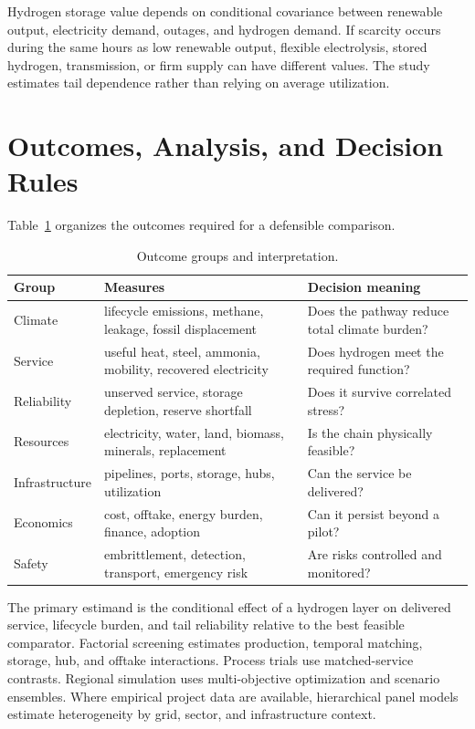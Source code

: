 \documentclass[conference]{IEEEtran}
\begin{document}
Hydrogen storage value depends on conditional covariance between renewable output, electricity demand, outages, and hydrogen demand. If scarcity occurs during the same hours as low renewable output, flexible electrolysis, stored hydrogen, transmission, or firm supply can have different values. The study estimates tail dependence rather than relying on average utilization.

\section{Outcomes, Analysis, and Decision Rules}
\label{sec:analysis}
Table~\ref{tab:outcomes} organizes the outcomes required for a defensible comparison.

\begin{table}[t]
\centering
\caption{Outcome groups and interpretation.}
\label{tab:outcomes}
\scriptsize
\setlength{\tabcolsep}{2pt}
\begin{tabular}{>{\raggedright\arraybackslash}p{}>{\raggedright\arraybackslash}p{}>{\raggedright\arraybackslash}p{}}
\toprule
Group & Measures & Decision meaning\\
\midrule
Climate & lifecycle emissions, methane, leakage, fossil displacement & Does the pathway reduce total climate burden?\\
Service & useful heat, steel, ammonia, mobility, recovered electricity & Does hydrogen meet the required function?\\
Reliability & unserved service, storage depletion, reserve shortfall & Does it survive correlated stress?\\
Resources & electricity, water, land, biomass, minerals, replacement & Is the chain physically feasible?\\
Infrastructure & pipelines, ports, storage, hubs, utilization & Can the service be delivered?\\
Economics & cost, offtake, energy burden, finance, adoption & Can it persist beyond a pilot?\\
Safety & embrittlement, detection, transport, emergency risk & Are risks controlled and monitored?\\
\bottomrule
\end{tabular}
\end{table}

The primary estimand is the conditional effect of a hydrogen layer on delivered service, lifecycle burden, and tail reliability relative to the best feasible comparator. Factorial screening estimates production, temporal matching, storage, hub, and offtake interactions. Process trials use matched-service contrasts. Regional simulation uses multi-objective optimization and scenario ensembles. Where empirical project data are available, hierarchical panel models estimate heterogeneity by grid, sector, and infrastructure context.
\end{document}
